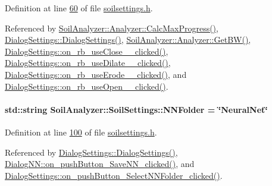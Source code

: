 Definition at line \hyperlink{soilsettings_8h_source_l00060}{60} of file \hyperlink{soilsettings_8h_source}{soilsettings.\+h}.



Referenced by \hyperlink{analyzer_8cpp_source_l00112}{Soil\+Analyzer\+::\+Analyzer\+::\+Calc\+Max\+Progress()}, \hyperlink{dialogsettings_8cpp_source_l00005}{Dialog\+Settings\+::\+Dialog\+Settings()}, \hyperlink{analyzer_8cpp_source_l00236}{Soil\+Analyzer\+::\+Analyzer\+::\+Get\+B\+W()}, \hyperlink{dialogsettings_8cpp_source_l00405}{Dialog\+Settings\+::on\+\_\+rb\+\_\+use\+Close\+\_\+\_\+clicked()}, \hyperlink{dialogsettings_8cpp_source_l00413}{Dialog\+Settings\+::on\+\_\+rb\+\_\+use\+Dilate\+\_\+\_\+clicked()}, \hyperlink{dialogsettings_8cpp_source_l00409}{Dialog\+Settings\+::on\+\_\+rb\+\_\+use\+Erode\+\_\+\_\+clicked()}, and \hyperlink{dialogsettings_8cpp_source_l00401}{Dialog\+Settings\+::on\+\_\+rb\+\_\+use\+Open\+\_\+\_\+clicked()}.

\hypertarget{class_soil_analyzer_1_1_soil_settings_a3c10433119931ebd347fb830c3020f39}{}
\paragraph[{N\+N\+Folder}]{\setlength{\rightskip}{0pt plus 5cm}std\+::string Soil\+Analyzer\+::\+Soil\+Settings\+::\+N\+N\+Folder = \char`\"{}Neural\+Net\char`\"{}}\label{class_soil_analyzer_1_1_soil_settings_a3c10433119931ebd347fb830c3020f39}


Definition at line \hyperlink{soilsettings_8h_source_l00100}{100} of file \hyperlink{soilsettings_8h_source}{soilsettings.\+h}.



Referenced by \hyperlink{dialogsettings_8cpp_source_l00005}{Dialog\+Settings\+::\+Dialog\+Settings()}, \hyperlink{dialognn_8cpp_source_l00118}{Dialog\+N\+N\+::on\+\_\+push\+Button\+\_\+\+Save\+N\+N\+\_\+clicked()}, and \hyperlink{dialogsettings_8cpp_source_l00487}{Dialog\+Settings\+::on\+\_\+push\+Button\+\_\+\+Select\+N\+N\+Folder\+\_\+clicked()}.

\hypertarget{class_soil_analyzer_1_1_soil_settings_a61bb233b0deaed4039b3eb05884a4854}{}
